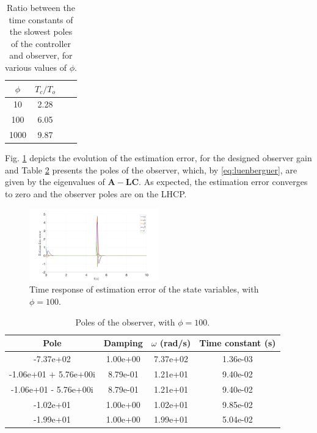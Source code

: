 \documentclass[letterpaper, 10 pt, conference]{ieeeconf}
\begin{document}
\begin{table}[h]
    \centering
    \caption{Ratio between the time constants of the slowest poles of the controller and observer, for various values of $\phi$.}
    \begin{tabular}{cccc}
         \hline
         $\phi$ & $T_c/T_o$ \\\hline
            10 & 2.28\\
            100 & 6.05 \\
            1000 & 9.87\\
        \hline
    \end{tabular}
    \label{tb:speed_r}
\end{table}

Fig. \ref{fig:LQG} depicts the evolution of the estimation error, for the designed observer gain and Table \ref{tb:cl_poles_obs} presents the poles of the observer, which, by \eqref{eq:luenberguer}, are given by the eigenvalues of $\mathbf{A}-\mathbf{LC}$. As expected, the estimation error converges to zero and the observer poles are on the LHCP.
\begin{figure}[h]
    \centering
    \includegraphics[width = 0.5\textwidth]{figures/LQG.png}
    \caption{Time response of estimation error of the state variables, with $\phi = 100$.}
    \label{fig:LQG}
\end{figure}
\begin{table}[h]
    \centering
    \caption{Poles of the observer, with $\phi = 100$.}
    \begin{tabular}{cccc}
         \hline
         Pole & Damping & $\omega$ (rad/s) & Time constant (s) \\\hline
-7.37e+02      &           1.00e+00   &    7.37e+02    &      1.36e-03   \\
 -1.06e+01 + 5.76e+00i   &  8.79e-01  &     1.21e+01 &         9.40e-02    \\
 -1.06e+01 - 5.76e+00i  &   8.79e-01     &  1.21e+01   &       9.40e-02   \\ 
 -1.02e+01             &    1.00e+00   &    1.02e+01   &       9.85e-02   \\ 
 -1.99e+01              &   1.00e+00   &    1.99e+01   &       5.04e-02  \\
        \hline
    \end{tabular}
    \label{tb:cl_poles_obs}
\end{table}
\end{document}
